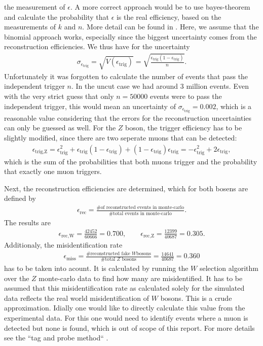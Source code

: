 \documentclass[twoside,        %
               BCOR12mm,       %
               ngerman,english, %
               fleqn,headsepline=false,footsepline=false
              ]{Vorlage/MFPREPORT}
\begin{document}
the measurement of $\epsilon$. A more correct approach would be to use
bayes-theorem and calculate the probability that $\epsilon$ is the real
efficiency, based on the measurements of $k$ and $n$. More detail can be found
in \cite{efferror}. Here, we assume that the binomial approach works,
especially since the biggest uncertainty comes from the reconstruction
efficiencies. We thus have for the uncertainty
\begin{align}
    \label{eq:uncerteff}
    \sigma_{\epsilon_\text{trig}}=\sqrt{V(\epsilon_\text{trig})}=\sqrt{\frac{\epsilon_\text{trig}(1-\epsilon_\text{trig})}{n}}.
\end{align}
Unfortunately it was forgotten to calculate the number of events that pass the
independent trigger $n$. In the uncut case we had around 3 million events. Even
with the very strict guess that only $n=50000$ events were to pass the
independent trigger, this would mean an uncertainty of
$\sigma_{\epsilon_\text{trig}}=0.002$, which is a reasonable value considering
that the errors for the reconstruction uncertainties can only be guessed as
well. For the $Z$ boson, the trigger efficiency has to be slightly modified,
since there are two seperate muons that can be detected:
\begin{align}
    \label{eq:trigeffZ}
    \epsilon_\text{trig,Z}=\epsilon_\text{trig}^2+\epsilon_\text{trig}(1-\epsilon_\text{trig})+(1-\epsilon_\text{trig})\epsilon_\text{trig}=-\epsilon_\text{trig}^2+2\epsilon_\text{trig},
\end{align}
which is the sum of the probabilities that both muons trigger and the
probability that exactly one muon triggers.

Next, the reconstruction efficiencies are determined, which for both bosens are
defined by
\begin{align}
    \label{eq:receff}
    \epsilon_\text{rec}=\frac{\text{\# of reconstructed events in
    monte-carlo}}{\text{\# total events in monte-carlo}}.
\end{align}
The results are
\begin{align}
    \label{eq:receffres}
    \epsilon_\text{rec,W}=\frac{42452}{60666}=0.700,\qquad
    \epsilon_\text{rec,Z}=\frac{12399}{40687}=0.305.
\end{align}
Additionaly, the misidentification rate
\begin{align}
    \label{eq:miss}
\epsilon_\text{miss}=\frac{\text{\# reconstructed fake $W$
bosons}}{\text{\# total $Z$ bosons}}=\frac{14641}{40687}=0.360
\end{align}
 has to be taken into
acount. It is calculated by running the $W$ selection algorithm over the $Z$
monte-carlo data to find how many are misidentified.
It has to be assumed that this misidentification rate as calculated solely for
the simulated data reflects the real world misidentification of $W$ bosons.
This is a crude approximation. Idially one would like to directly calculate
this value from the experimental data. For this one would need to identify
events where a muon is detected but none is found, which is out of scope
of this report. For more details see the ``tag and probe method`` \cite{tagprobe}.
\end{document}
